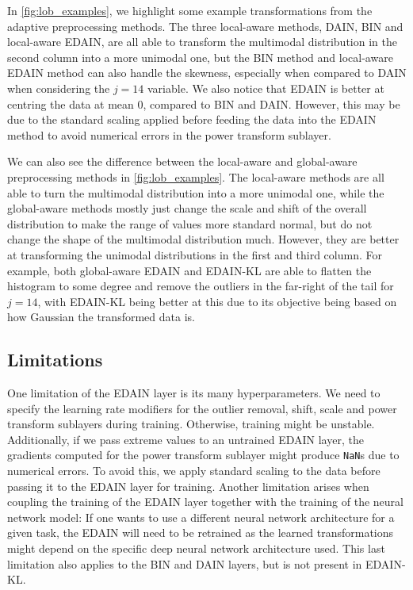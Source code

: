 \documentclass{statsmsc}
\begin{document}
{In \cref{fig:lob_examples}, we highlight some example transformations from the adaptive
preprocessing methods.
The three local-aware methods, \ac{DAIN}, \ac{BIN} and local-aware \ac{EDAIN}, are all able
to transform the multimodal distribution in the second column into a more unimodal one,
but the \ac{BIN} method and local-aware \ac{EDAIN} method can also handle the skewness,
especially when compared to \ac{DAIN} when considering the $j=14$ variable.
We also notice that \ac{EDAIN} is better at centring the data at mean 0, compared to \ac{BIN}
and \ac{DAIN}. However, this may be due to the standard scaling applied before feeding the data
into the \ac{EDAIN} method to avoid numerical errors in the power transform sublayer.

We can also see the difference between  the local-aware and global-aware preprocessing methods in
\cref{fig:lob_examples}.
The local-aware methods are all able to turn the multimodal distribution into a more unimodal
one, while the global-aware methods mostly just change the scale and shift of the overall
distribution to make the range of values more standard normal, but do not change the shape of the
multimodal distribution much. However, they are better at transforming the unimodal distributions
in the first and third column. For example, both global-aware \ac{EDAIN} and \ac{EDAIN-KL}
are able to flatten the histogram to some degree and remove the outliers in the far-right of the
tail for $j=14$, with \ac{EDAIN-KL} being better at this due to its objective being based on how
Gaussian the transformed data is.


\subsection{Limitations}%
\label{sub:Limitations}

One limitation of the \ac{EDAIN} layer is its many hyperparameters. We need to specify the
learning rate modifiers for the outlier removal, shift, scale and power transform sublayers
during training. Otherwise, training might be unstable.
Additionally, if we pass extreme values to an untrained \ac{EDAIN} layer, the gradients computed
for the power transform sublayer might produce \texttt{NaN}s due to numerical errors. To avoid
this, we apply standard scaling to the data before passing it to
the \ac{EDAIN} layer for training.
Another limitation arises when coupling the training of the \ac{EDAIN}
layer together with the training of the neural network model: If one wants to use a different
neural network architecture for a given task, the \ac{EDAIN} will need to be retrained as the
learned transformations might depend on the specific deep neural network architecture used.
This last limitation also applies to the \ac{BIN} and \ac{DAIN} layers, but is not present in
\ac{EDAIN-KL}.

}
\end{document}
